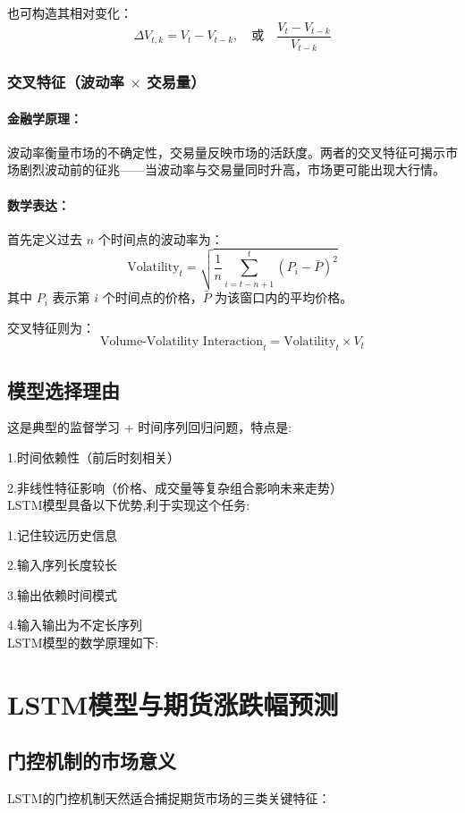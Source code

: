 \documentclass[a4paper,12pt]{ctexart}
\begin{document}
也可构造其相对变化：
\[
\Delta V_{t,k} = V_t - V_{t-k}, \quad \text{或} \quad \frac{V_t - V_{t-k}}{V_{t-k}}
\]

\subsubsection{交叉特征（波动率 $\times$ 交易量）}

\paragraph{金融学原理：}

波动率衡量市场的不确定性，交易量反映市场的活跃度。两者的交叉特征可揭示市场剧烈波动前的征兆——当波动率与交易量同时升高，市场更可能出现大行情。

\paragraph{数学表达：}

首先定义过去 $n$ 个时间点的波动率为：
\[
\text{Volatility}_t = \sqrt{\frac{1}{n} \sum_{i=t-n+1}^{t} (P_i - \bar{P})^2}
\]
其中 $P_i$ 表示第 $i$ 个时间点的价格，$\bar{P}$ 为该窗口内的平均价格。

交叉特征则为：
\[
\text{Volume-Volatility Interaction}_t = \text{Volatility}_t \times V_t
\]

\newpage
\subsection{模型选择理由}

这是典型的监督学习 + 时间序列回归问题，特点是:

1.时间依赖性（前后时刻相关）

2.非线性特征影响（价格、成交量等复杂组合影响未来走势）\\

LSTM模型具备以下优势,利于实现这个任务:

1.记住较远历史信息

2.输入序列长度较长

3.输出依赖时间模式

4.输入输出为不定长序列\\

LSTM模型的数学原理如下:

\section*{LSTM模型与期货涨跌幅预测}
\subsection*{门控机制的市场意义}
LSTM的门控机制天然适合捕捉期货市场的三类关键特征：
\end{document}
